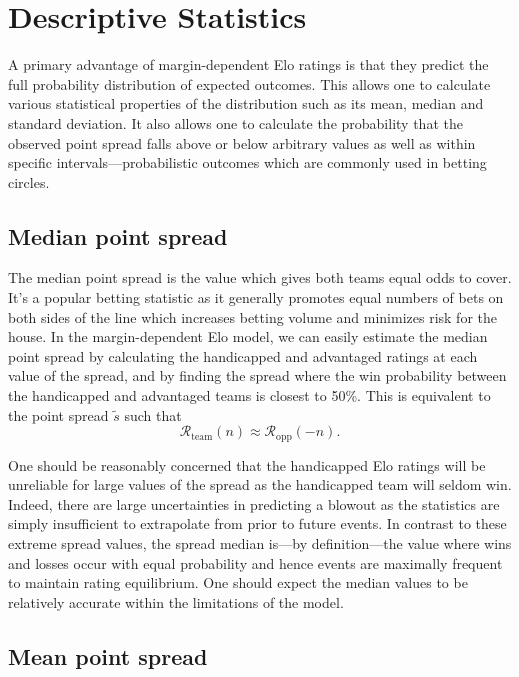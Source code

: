 \documentclass[aps,prc,reprint,amsmath,superscriptaddress,nofootinbib]{revtex4-1}
\newcommand{\R}{\mathcal{R}}
\begin{document}
\section{Descriptive Statistics}

A primary advantage of margin-dependent Elo ratings is that they predict the full probability distribution of expected outcomes.
This allows one to calculate various statistical properties of the distribution such as its mean, median and standard deviation.
It also allows one to calculate the probability that the observed point spread falls above or below arbitrary values as well as within specific intervals---probabilistic outcomes which are commonly used in betting circles.

\subsection{Median point spread}

The median point spread is the value which gives both teams equal odds to cover.
It's a popular betting statistic as it generally promotes equal numbers of bets on both sides of the line which increases betting volume and minimizes risk for the house.
In the margin-dependent Elo model, we can easily estimate the median point spread by calculating the handicapped and advantaged ratings at each value of the spread, and by finding the spread where the win probability between the handicapped and advantaged teams is closest to 50\%.
This is equivalent to the point spread $\tilde{s}$ such that
\begin{equation}
  \R_\text{team}(n) \approx \R_\text{opp}(-n).
\end{equation}

One should be reasonably concerned that the handicapped Elo ratings will be unreliable for large values of the spread as the handicapped team will seldom win.
Indeed, there are large uncertainties in predicting a blowout as the statistics are simply insufficient to extrapolate from prior to future events.
In contrast to these extreme spread values, the spread median is---by definition---the value where wins and losses occur with equal probability and hence events are maximally frequent to maintain rating equilibrium.
One should expect the median values to be relatively accurate within the limitations of the model.

\subsection{Mean point spread}
\end{document}
